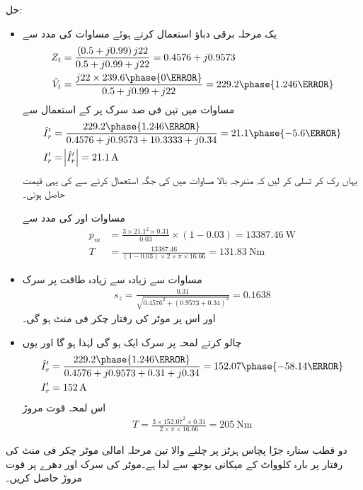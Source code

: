 حل:
\begin{itemize}
\item
 یک مرحلہ  برقی دباؤ   استعمال کرتے ہوئے مساوات   کی مدد سے
\begin{align*}
Z_t&=\frac{\left(0.5+j 0.99 \right) j 22}{0.5+j 0.99+j 22}=0.4576+j 0.9573\\
\hat{V}_t&=\frac{j 22 \times 239.6 \phase{0\degree}}{0.5+j 0.99+j 22}=229.2\phase{1.246\degree}
\end{align*}
مساوات   میں  تین فی صد سرک پر  کے استعمال سے
\begin{align*}
\hat{I}_r'&=\frac{229.2 \phase{1.246\degree}}{0.4576+j 0.9573+10.3333+j 0.34}=21.1\phase{-5.6\degree}\\
I_r'&=\abs{\hat{I}_r'}=\SI{21.1}{\ampere}
\end{align*}
یہاں رک کر تسلی کر لیں کہ مندرجہ بالا مساوات میں  کی جگہ  استعمال کرنے سے  کی یہی قیمت حاصل ہوتی۔

مساوات   اور   کی مدد سے
\begin{align*}
p_m&=\frac{3\times 21.1^2\times 0.31}{0.03} \times (1-0.03)=\SI{13387.46}{\watt}\\
T&=\frac{13387.46}{(1-0.03) \times 2\times \pi \times 16.66}=\SI{131.83}{\newton \meter}
\end{align*}
%
\item
مساوات   سے زیادہ سے زیادہ طاقت پر سرک
\begin{align*}
s_z=\frac{0.31}{\sqrt{0.4576^2+(0.9573+0.34)^2}}=0.1638
\end{align*}
اور اس پر موٹر کی رفتار  چکر فی منٹ ہو گی۔
\item
چالو کرتے لمحہ پر سرک ایک ہو گی لہٰذا  ہو گا اور یوں
\begin{align*}
\hat{I}_r'&=\frac{229.2 \phase{1.246\degree}}{0.4576+j 0.9573+0.31+j 0.34}=152.07\phase{-58.14\degree}\\
I_r'&=\SI{152}{\ampere}
\end{align*}
اس لمحہ قوت مروڑ
\begin{align*}
T=\frac{3 \times 152.07^2 \times 0.31}{2 \times \pi \times 16.66}=\SI{205}{\newton \meter}
\end{align*}
\end{itemize}
%
دو قطب ستارہ جڑا پچاس ہرٹز پر چلنے والا تین مرحلہ امالی موٹر   چکر فی منٹ کی رفتار پر بارہ کلوواٹ کے میکانی بوجھ سے لدا ہے۔موٹر کی سرک اور دھرے پر قوت مروڑ  حاصل کریں۔

